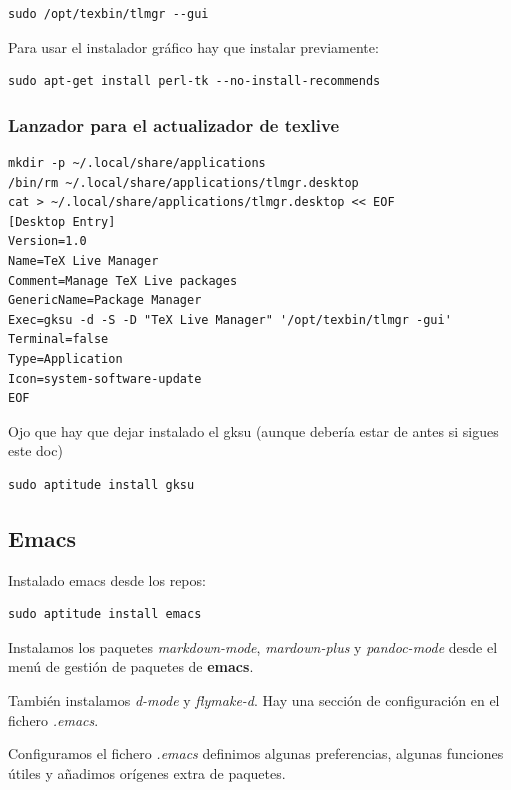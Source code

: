 \documentclass[12pt,spanish,]{article}
\begin{document}
\begin{verbatim}
sudo /opt/texbin/tlmgr --gui
\end{verbatim}

Para usar el instalador gráfico hay que instalar previamente:

\begin{verbatim}
sudo apt-get install perl-tk --no-install-recommends
\end{verbatim}

\subsubsection{Lanzador para el actualizador de
texlive}\label{lanzador-para-el-actualizador-de-texlive}

\begin{verbatim}
mkdir -p ~/.local/share/applications
/bin/rm ~/.local/share/applications/tlmgr.desktop
cat > ~/.local/share/applications/tlmgr.desktop << EOF
[Desktop Entry]
Version=1.0
Name=TeX Live Manager
Comment=Manage TeX Live packages
GenericName=Package Manager
Exec=gksu -d -S -D "TeX Live Manager" '/opt/texbin/tlmgr -gui'
Terminal=false
Type=Application
Icon=system-software-update
EOF
\end{verbatim}

Ojo que hay que dejar instalado el gksu (aunque debería estar de antes
si sigues este doc)

\begin{verbatim}
sudo aptitude install gksu
\end{verbatim}

\subsection{Emacs}\label{emacs}

Instalado emacs desde los repos:

\begin{verbatim}
sudo aptitude install emacs
\end{verbatim}

Instalamos los paquetes \emph{markdown-mode}, \emph{mardown-plus} y
\emph{pandoc-mode} desde el menú de gestión de paquetes de
\textbf{emacs}.

También instalamos \emph{d-mode} y \emph{flymake-d}. Hay una sección de
configuración en el fichero \emph{.emacs}.

Configuramos el fichero \emph{.emacs} definimos algunas preferencias,
algunas funciones útiles y añadimos orígenes extra de paquetes.
\end{document}
